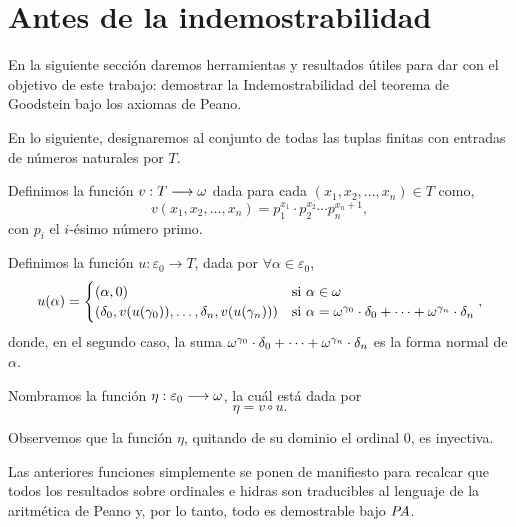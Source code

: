 \section{Antes de la indemostrabilidad}
En la siguiente sección daremos herramientas y resultados útiles para dar con el objetivo de este trabajo: demostrar la Indemostrabilidad del teorema de Goodstein bajo los axiomas de Peano.
\begin{obs}
    En lo siguiente, designaremos al conjunto de todas las tuplas finitas con entradas de números naturales por $T$.
\end{obs}
\begin{defn}
    Definimos la función $v:T\longrightarrow\omega$ dada para cada $(x_1,x_2,\ldots,x_n)\in T$ como,\[v(x_1,x_2,\ldots,x_n)=p_1^{x_1}\cdot p_2^{x_2}\cdots p_n^{x_{n}+1},\] con $p_i$ el $i$-ésimo número primo.
\end{defn}
\begin{defn}
    Definimos la función $u:\varepsilon_0\longrightarrow T$, dada por $\forall \alpha\in\varepsilon_0$,
    \[
        u(\alpha)=
        \begin{cases}
        (\alpha,0)&\text{si }\alpha\in\omega \\
        (\delta_0,v(u(\gamma_0)),\ldots,\delta_n,v(u(\gamma_n)))&\text{si }\alpha=\omega^{\gamma_0}\cdot\delta_0+\cdots+\omega^{\gamma_n}\cdot\delta_n
        \end{cases},
    \]
    donde, en el segundo caso, la suma $\omega^{\gamma_0}\cdot\delta_0+\cdots+\omega^{\gamma_n}\cdot\delta_n$ es la forma normal de $\alpha$.
\end{defn}
\begin{defn}\label{eta}
    Nombramos la función $\eta:\varepsilon_0\longrightarrow\omega$, la cuál está dada por \[\eta=v\circ u.\]
\end{defn}
\begin{obs}
Observemos que la función $\eta$, quitando de su dominio el ordinal $0$, es inyectiva. 
\end{obs}

Las anteriores funciones simplemente se ponen de manifiesto para recalcar que todos los resultados sobre ordinales e hidras son traducibles al lenguaje de la aritmética de Peano y, por lo tanto, todo es demostrable bajo $\textit{PA}$.

